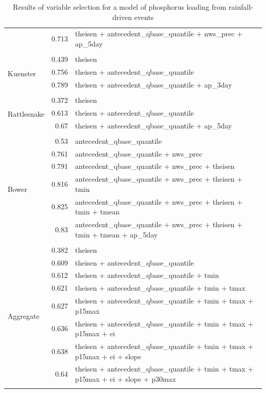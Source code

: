 \documentclass[10pt]{article}
\begin{document}
\begin{table}[h]
\begin{center}
\begin{tabular}{lrl}
 & 0.713 & theisen + antecedent\_qbase\_quantile + nws\_prec + ap\_5day\\ 
\vspace{2mm}\\ \multirow{4}{*}{Kuenster} & 0.439 & theisen\\ 
 & 0.756 & theisen + antecedent\_qbase\_quantile\\ 
 & 0.789 & theisen + antecedent\_qbase\_quantile + ap\_3day\\ 
\vspace{2mm}\\ \multirow{4}{*}{Rattlesnake} & 0.372 & theisen\\ 
 & 0.613 & theisen + antecedent\_qbase\_quantile\\ 
 & 0.67 & theisen + antecedent\_qbase\_quantile + ap\_5day\\ 
\vspace{2mm}\\ \multirow{7}{*}{Bower} & 0.53 & antecedent\_qbase\_quantile\\ 
 & 0.761 & antecedent\_qbase\_quantile + nws\_prec\\ 
 & 0.791 & antecedent\_qbase\_quantile + nws\_prec + theisen\\ 
 & 0.816 & antecedent\_qbase\_quantile + nws\_prec + theisen + tmin\\ 
 & 0.825 & antecedent\_qbase\_quantile + nws\_prec + theisen + tmin + tmean\\ 
 & 0.83 & antecedent\_qbase\_quantile + nws\_prec + theisen + tmin + tmean + ap\_5day\\ 
\vspace{2mm}\\ \multirow{9}{*}{Aggregate} & 0.382 & theisen\\ 
 & 0.609 & theisen + antecedent\_qbase\_quantile\\ 
 & 0.612 & theisen + antecedent\_qbase\_quantile + tmin\\ 
 & 0.621 & theisen + antecedent\_qbase\_quantile + tmin + tmax\\ 
 & 0.627 & theisen + antecedent\_qbase\_quantile + tmin + tmax + p15max\\ 
 & 0.636 & theisen + antecedent\_qbase\_quantile + tmin + tmax + p15max + ei\\ 
 & 0.638 & theisen + antecedent\_qbase\_quantile + tmin + tmax + p15max + ei + slope\\ 
 & 0.64 & theisen + antecedent\_qbase\_quantile + tmin + tmax + p15max + ei + slope + p30max\\ 
\vspace{2mm}\\     \end{tabular}
    \caption{Results of variable selection for a model of phosphorus loading from rainfall-driven events\label{phos_r_square_nosnow}}
    \end{center}
\end{table}
\end{document}
